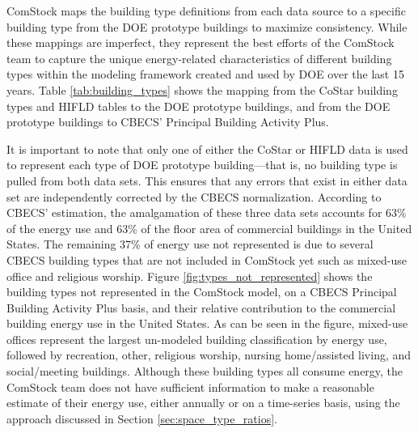 ComStock maps the building type definitions from each data source to a specific building type from the DOE prototype buildings to maximize consistency. While these mappings are imperfect, they represent the best efforts of the ComStock team to capture the unique energy-related characteristics of different building types within the modeling framework created and used by DOE over the last 15 years. Table \ref{tab:building_types} shows the mapping from the CoStar building types and HIFLD tables to the DOE prototype buildings, and from the DOE prototype buildings to CBECS' Principal Building Activity Plus.



It is important to note that only one of either the CoStar or HIFLD data is used to represent each type of DOE prototype building---that is, no building type is pulled from both data sets. This ensures that any errors that exist in either data set are independently corrected by the CBECS normalization. According to CBECS' estimation, the amalgamation of these three data sets accounts for 63\% of the energy use and 63\% of the floor area of commercial buildings in the United States. The remaining 37\% of energy use not represented is due to several CBECS building types that are not included in ComStock yet such as mixed-use office and religious worship. Figure \ref{fig:types_not_represented} shows the building types not represented in the ComStock model, on a CBECS Principal Building Activity Plus basis, and their relative contribution to the commercial building energy use in the United States. As can be seen in the figure, mixed-use offices represent the largest un-modeled building classification by energy use, followed by recreation, other, religious worship, nursing home/assisted living, and social/meeting buildings. Although these building types all consume energy, the ComStock team does not have sufficient information to make a reasonable estimate of their energy use, either annually or on a time-series basis, using the approach discussed in Section \ref{sec:space_type_ratios}.

